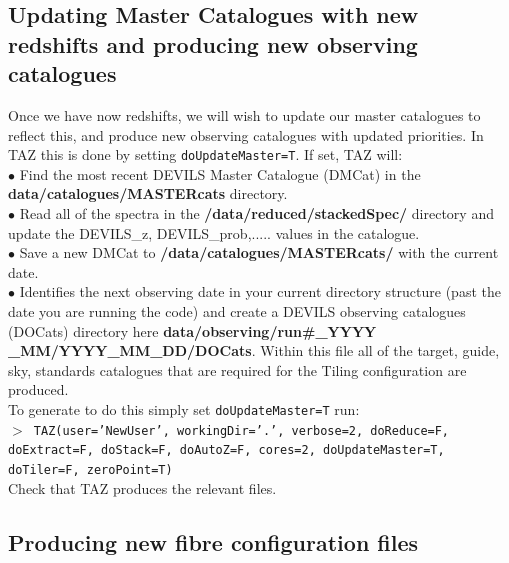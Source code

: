 \documentclass[12pt]{article}
\begin{document}
 \subsection{Updating Master Catalogues with new redshifts and producing new observing catalogues}

Once we have now redshifts, we will wish to update our master catalogues to reflect this, and produce new observing catalogues with updated priorities. In TAZ this is done by setting \texttt{doUpdateMaster=T}. If set, TAZ will:\\

$\bullet$ Find the most recent DEVILS Master Catalogue (DMCat) in the \textbf{data/catalogues/MASTERcats} directory.\\


$\bullet$ Read all of the spectra in the \textbf{/data/reduced/stackedSpec/} directory and update the DEVILS\_z,  DEVILS\_prob,..... values in the catalogue.\\

$\bullet$ Save a new DMCat to \textbf{/data/catalogues/MASTERcats/} with the current date. \\

$\bullet$ Identifies the next observing date in your current directory structure (past the date you are running the code) and create a DEVILS observing catalogues (DOCats) directory here \textbf{data/observing/run\#\_YYYY \_MM/YYYY\_MM\_DD/DOCats}. Within this file all of the target, guide, sky, standards catalogues that are required for the Tiling configuration are produced.\\

To generate to do this simply set \texttt{doUpdateMaster=T} run:\\

  \hspace{10mm} \texttt{$>$ TAZ(user='NewUser', workingDir='.', verbose=2, doReduce=F, doExtract=F, doStack=F, doAutoZ=F,  cores=2, doUpdateMaster=T, doTiler=F, zeroPoint=T)}\\  
  
  Check that TAZ produces the relevant files. 


 \subsection{Producing new fibre configuration files}
 
\end{document}
